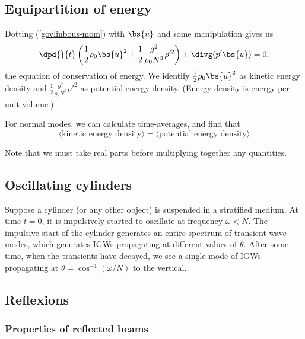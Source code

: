 \subsection{Equipartition of energy}

Dotting (\ref{govlinbous-mom}) with $\bs{u}$ and some manipulation gives us
\begin{equation}
	\dpd{}{t}\left(\frac{1}{2}\rho_0 \bs{u}^2 + \frac{1}{2}\frac{g^2}{\rho_0N^2}\rho'^2\right) + \divg(p'\bs{u}) = 0,
\end{equation}
the equation of conservation of energy. We identify $ \frac{1}{2}\rho_0 \bs{u}^2 $ as kinetic energy density and $\frac{1}{2}\frac{g^2}{\rho_0N^2}\rho'^2$ as potential energy density. (Energy density is energy per unit volume.)

For normal modes, we can calculate time-averages, and find that 
\begin{equation}
\langle\text{kinetic energy density}\rangle = \langle\text{potential energy density}\rangle
\end{equation}

Note that we must take real parts before multiplying together any quantities. 

\subsection{Oscillating cylinders}

Suppose a cylinder (or any other object) is suspended in a stratified medium. At time $t=0$, it is impulsively started to oscillate at frequency $\omega<N$. The impulsive start of the cylinder generates an entire spectrum of transient wave modes, which generates IGWs propagating at different values of $\theta$. After some time, when the transients have decayed, we see a single mode of IGWs propagating at $\theta = \cos^{-1} (\omega/N)$ to the vertical. 

\subsection{Reflexions}
\subsubsection{Properties of reflected beams}

